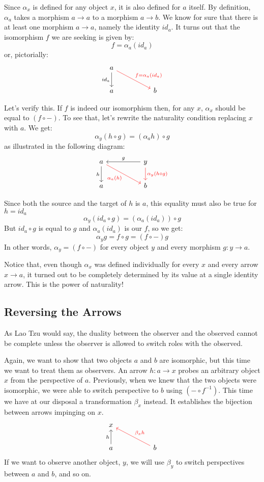 \documentclass[DaoFP]{subfiles}
\begin{document}
Since $\alpha_x$ is defined for any object $x$, it is also defined for $a$ itself. By definition, $\alpha_a$ takes a morphism $a \to a$ to a morphism $a \to b$. We know for sure that there is at least one morphism $a \to a$, namely the identity $id_a$. It turns out that the isomorphism $f$ we are seeking is given by:
\[f = \alpha_a (id_a)\]
or, pictorially:
\[
 \begin{tikzcd}
a
 \arrow[d, "id_a"']
 \arrow[rrd, red, "f = \alpha_a (id_a)"]
  \\
 a
  && b
 \end{tikzcd}
\]

Let's verify this. If $f$ is indeed our isomorphism then, for any $x$, $\alpha_x$ should be equal to  $(f \circ -)$. To see that, let's rewrite the naturality condition replacing $x$ with $a$. We get:
\[\alpha_y(h \circ g) = (\alpha_a h) \circ g \]
as illustrated in the following diagram:
\[
 \begin{tikzcd}
 a
 \arrow[d, "h"']
 \arrow[rrd,  red, "\alpha_a (h)"']
 && y
 \arrow[ll, "g"']
 \arrow[d, red, "\alpha_y (h \circ g)"]
   \\
 a
  && b
 \end{tikzcd}
\]


Since both the source and the target of $h$ is $a$, this equality must also be true for $h = id_a$
\[\alpha_y (id_a \circ g) = (\alpha_a (id_a)) \circ g \]
But $id_a \circ g$ is equal to $g$ and $\alpha_a(id_a)$ is our $f$, so we get:
\[\alpha_y g = f \circ g = (f \circ -) g\]
In other words, $\alpha_y = (f \circ -)$ for every object $y$ and every morphism $g \colon y \to a$.

Notice that, even though $\alpha_x$ was defined individually for every $x$ and every arrow $x \to a$, it turned out to be completely determined by its value at a single identity arrow. This is the power of naturality!
\subsection{Reversing the Arrows}
As Lao Tzu would say, the duality between the observer and the observed cannot be complete unless the observer is allowed to switch roles with the observed. 

Again, we want to show that two objects $a$ and $b$ are isomorphic, but this time we want to treat them as observers. An arrow $h \colon a \to x$ probes an arbitrary object $x$ from the perspective of $a$. Previously, when we knew that the two objects were isomorphic, we were able to switch perspective to $b$ using $(- \circ f^{-1})$. This time we have at our disposal a transformation $\beta_x$ instead. It establishes the bijection between arrows impinging on $x$.
\[
 \begin{tikzcd}
 x
 \\
 a
\arrow[u, "h"]
 && b
  \arrow[llu, red, "\beta_x h"']
  \end{tikzcd}
\]
If we want to observe another object, $y$, we will use $\beta_y$ to switch perspectives between $a$ and $b$, and so on. 
\end{document}
